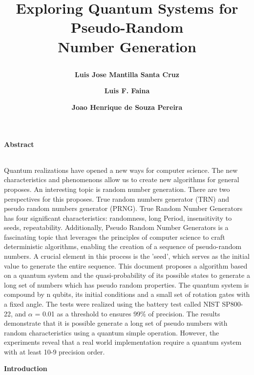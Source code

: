 \documentclass[12pt]{article}
\title{	\raggedright\Large\textbf{Exploring Quantum Systems for Pseudo-Random\\
	Number Generation}}
\author[1,a]{\raggedright\small\textbf{Luis Jose Mantilla Santa Cruz}}
\author[1,b]{\textbf{Luis F. Faina}}
\author[1,c]{\textbf{ Joao Henrique de Souza Pereira}}
\affil[1]{Federal University of Uberlandia, Faculty of Computing, Uberl andia, Minas Gerais, Brazil}
\affil[a]{\textit{luis.santa@ufu.br}}
\affil[b]{\textit{luisfaina@ufu.br}}
\affil[c]{\textit{joaohs@ufu.br}}
\date{}
\begin{document}
	\maketitle
	{\raggedright\large\textbf{Abstract}}\\
	
	{Quantum realizations have opened a new ways for computer science. The new characteristics and phenomenons allow us to
	create new algorithms for general proposes. An interesting topic is random number generation. There are two perspectives for
	this proposes. True random numbers generator (TRN) and pseudo random numbers generator (PRNG). True Random Number
	Generators has four significant characteristics: randomness, long Period, insensitivity to seeds, repeatability. Additionally,
	Pseudo Random Number Generators is a fascinating topic that leverages the principles of computer science to craft deterministic
	algorithms, enabling the creation of a sequence of pseudo-random numbers. A crucial element in this process is the ’seed’,
	which serves as the initial value to generate the entire sequence. This document proposes a algorithm based on a quantum
	system and the quasi-probability of its possible states to generate a long set of numbers which has pseudo random properties.
	The quantum system is compound by n qubits, its initial conditions and a small set of rotation gates with a fixed angle. The
	tests were realized using the battery test called NIST SP800-22, and $\alpha$ = 0.01 as a threshold to ensures 99\% of precision. The
	results demonstrate that it is possible generate a long set of pseudo numbers with random characteristics using a quantum
	simple operation. However, the experiments reveal that a real world implementation require a quantum system with at least
	10-9 precision order.}\\
	
	{\raggedright\large\textbf{Introduction}}\\
	
\end{document}
